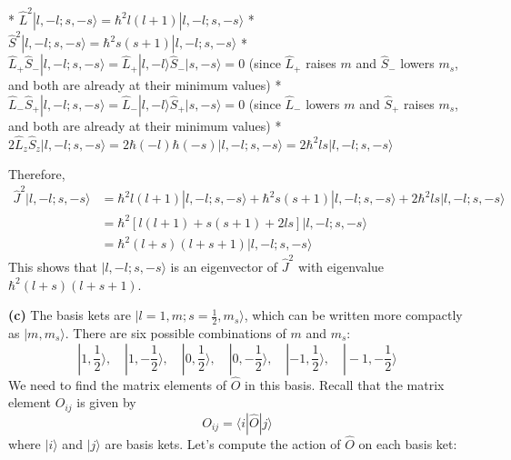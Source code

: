 \documentclass{article}
\begin{document}
* $\hat{L}^2 |l, -l; s, -s\rangle = \hbar^2 l(l+1) |l, -l; s, -s\rangle$
* $\hat{S}^2 |l, -l; s, -s\rangle = \hbar^2 s(s+1) |l, -l; s, -s\rangle$
* $\hat{L}_+ \hat{S}_- |l, -l; s, -s\rangle = \hat{L}_+ |l, -l\rangle \hat{S}_- |s, -s\rangle = 0$ (since $\hat{L}_+$ raises $m$ and $\hat{S}_-$ lowers $m_s$, and both are already at their minimum values)
* $\hat{L}_- \hat{S}_+ |l, -l; s, -s\rangle = \hat{L}_- |l, -l\rangle \hat{S}_+ |s, -s\rangle = 0$ (since $\hat{L}_-$ lowers $m$ and $\hat{S}_+$ raises $m_s$, and both are already at their minimum values)
* $2 \hat{L}_z \hat{S}_z |l, -l; s, -s\rangle = 2 \hbar (-l) \hbar (-s) |l, -l; s, -s\rangle = 2 \hbar^2 ls |l, -l; s, -s\rangle$

Therefore,
\begin{align*}
\hat{J}^2 |l, -l; s, -s\rangle &= \hbar^2 l(l+1) |l, -l; s, -s\rangle + \hbar^2 s(s+1) |l, -l; s, -s\rangle + 2 \hbar^2 ls |l, -l; s, -s\rangle \\
&= \hbar^2 [l(l+1) + s(s+1) + 2ls] |l, -l; s, -s\rangle \\
&= \hbar^2 (l+s)(l+s+1) |l, -l; s, -s\rangle
\end{align*}
This shows that $|l, -l; s, -s\rangle$ is an eigenvector of $\hat{J}^2$ with eigenvalue $\hbar^2 (l+s)(l+s+1)$.

\textbf{(c)} 
The basis kets are $|l = 1, m; s = \frac{1}{2}, m_s\rangle$, which can be written more compactly as $|m, m_s\rangle$. There are six possible combinations of $m$ and $m_s$:
\[
|1, \frac{1}{2}\rangle, \quad |1, -\frac{1}{2}\rangle, \quad |0, \frac{1}{2}\rangle, \quad |0, -\frac{1}{2}\rangle, \quad |-1, \frac{1}{2}\rangle, \quad |-1, -\frac{1}{2}\rangle
\]
We need to find the matrix elements of $\hat{O}$ in this basis.  Recall that the matrix element $O_{ij}$ is given by
\[
O_{ij} = \langle i | \hat{O} | j \rangle
\]
where $|i\rangle$ and $|j\rangle$ are basis kets.  Let's compute the action of $\hat{O}$ on each basis ket:
\end{document}
